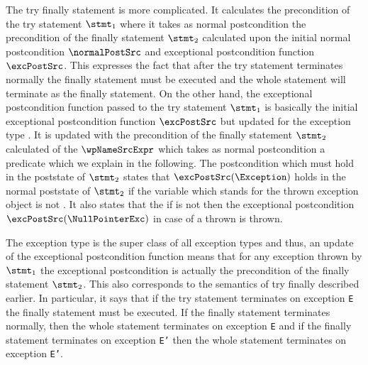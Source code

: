 The  \textsf{try finally} statement is more complicated. It calculates the precondition of the try statement $\stmt_1$ where it takes as normal postcondition
the precondition of the finally statement $\stmt_2$  calculated upon the initial normal postcondition $\normalPostSrc$ and exceptional postcondition function
 $\excPostSrc$. This expresses the fact that after the try statement terminates normally the finally statement must be executed and the whole statement will terminate 
as the finally statement. 
On the other hand, the exceptional postcondition function passed to the try statement $\stmt_1$ is basically the initial exceptional postcondition function $\excPostSrc$ but updated for the exception
type \Exception{}. It is updated 
 with the precondition of the finally statement $\stmt_2$ calculated of the $\wpNameSrcExpr$ which takes as normal postcondition a predicate which we explain in the following.
The postcondition which must hold in the poststate of  $\stmt_2$  states that   $\excPostSrc(\Exception)$ holds in the normal poststate of $\stmt_2$ if the variable
\EXC{} which stands for the thrown exception object is not \Mynull. It also states that the if \EXC{} is not \Mynull then the exceptional
postcondition  $\excPostSrc(\NullPointerExc)$ in case of a thrown \NullPointerExc{} is thrown.

 The exception type \Exception{} is the super class of all exception types and thus, 
an update of the exceptional postcondition function 
means that for any exception thrown by $\stmt_1$ the exceptional postcondition is actually the precondition of the finally statement $\stmt_2$.
 This also 
corresponds to the semantics of \textsf{try finally}  described earlier. In particular, it says that if the try statement terminates on exception \texttt{E}
the finally statement must be executed. If the finally statement terminates normally, then the  whole statement terminates on exception \texttt{E} and if the finally statement
terminates on exception  \texttt{E'} then the  whole statement terminates on exception \texttt{E'}.
